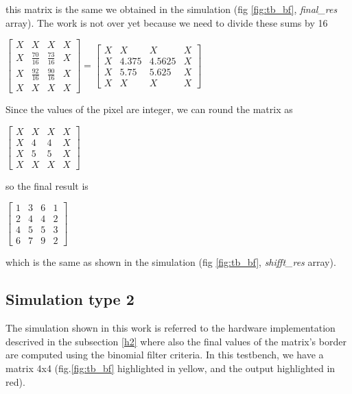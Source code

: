 	  this matrix is the same we obtained in the simulation (fig \ref{fig:tb_bf}, \textit{final\_res} array).
	  The work is not over yet because we need to divide these sums by 16
	  \begin{center}
	  	$ \begin{bmatrix}
	  	X & X & X & X\\
	  	X & \frac{70}{16} & \frac{73}{16} & X   	\\
	  	X&\frac{92}{16}  & \frac{90}{16}  & X\\
	  	X&X & X & X
	  \end{bmatrix}=\begin{bmatrix}
	  X & X & X & X\\
	  X & 4.375 & 4.5625 & X   	\\
	  X&5.75  & 5.625  & X\\
	  X&X & X & X
	  \end{bmatrix}$
	  \end{center}
	  Since the values of the pixel are integer, we can round the matrix as\begin{center}
	  	$ 
	  \begin{bmatrix}
	  	X & X & X & X\\
	  	X & 4 & 4 & X   	\\
	  	X&5  & 5  & X\\
	  	X&X & X & X
	  \end{bmatrix}$
	  \end{center}
	  so the final result is \begin{center}
	  	$ 
	  	\begin{bmatrix}
	  	1 & 3 & 6 & 1\\
	  	2 & 4 & 4 & 2   	\\
	  4&5  & 5  & 3\\
	  	6&7 & 9 & 2
	  	\end{bmatrix}$
	  \end{center}
	  which is the same as shown in the simulation (fig \ref{fig:tb_bf}, \textit{shifft\_res} array).
	  \subsection{Simulation type 2}
	
	  The simulation shown in this work is referred to the hardware implementation descrived in the subsection \ref{h2} where also the final values of the matrix's border are computed using the binomial filter criteria.
	  In this testbench, we have a matrix 4x4 (fig.\ref{fig:tb_bf} highlighted in yellow, and the output highlighted in red).
	  
